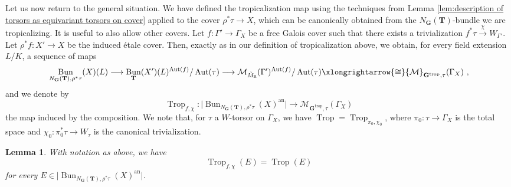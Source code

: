 \documentclass[10pt, a4paper]{amsart}
\newtheorem{lemma}[theorem]{Lemma}
\theoremstyle{definition}
\theoremstyle{myitemstyle}
\newcommand{\R}{\mathbb{R}}
\newcommand{\Mcheck}{{\check{M}}}
\newcommand{\bfG}{\mathbf{G}}
\newcommand{\bfT}{\mathbf{T}}
\newcommand{\mc}[1]{{\mathcal{#1}}}
\DeclareMathOperator{\Aut}{Aut}
\DeclareMathOperator{\Trop}{Trop}
\DeclareMathOperator{\Bun}{Bun}
\newcommand{\an}{\mathrm{an}}
\newcommand{\trop}{{\mathrm{trop}}}
\newcommand{\Ga}{\Gamma}
\begin{document}
Let us now return to the general situation. We have defined the tropicalization map using the techniques from Lemma \ref{lem:description of torsors as equivariant torsors on cover} applied to the cover $\rho^*\tau\to X$, which can be canonically obtained from the $N_\bfG(\bfT)$-bundle we are tropicalizing. It is useful to also allow other covers. 
Let $f\colon \Gamma'\to \Gamma_X$ be a free Galois  cover such that there exists a trivialization $f^*\tau\xrightarrow{\chi}W_{\Gamma'}$.
Let $\rho^*f\colon X'\to X$ be the induced étale cover.
Then, exactly as in our definition of tropicalization above, we obtain, for every field extension $L/K$, a sequence of maps
\[
\Bun_{N_\bfG(\bfT),\rho^*\tau}(X)(L) \longrightarrow \Bun_{\bfT}(X')(L)^{\Aut(f)}/\Aut(\tau) \longrightarrow \mc M_{\Mcheck_\R}(\Gamma')^{\Aut(f)}/\Aut(\tau)\xlongrightarrow{\cong} \mc M_{\bfG^\trop,\tau}(\Gamma_X) \ ,
\]
and we denote by
\[
\Trop_{f,\chi}\colon \big|\Bun_{N_\bfG(\bfT),\rho^*\tau}(X)^\an\big|\longrightarrow \mc M_{\bfG^\trop,\tau}(\Gamma_X)
\]
the map induced by the composition. We note that, for $\tau$ a $W$-torsor on $\Ga_X$, we have $\Trop=\Trop_{\pi_0,\chi_0}$, where $\pi_0:\tau\to \Ga_X$ is the total space and $\chi_0:\pi_0^*\tau\to W_{\tau}$ is the canonical trivialization. 

\begin{lemma}
\label{lem:tropicalization wrt a cover}
With notation as above, we have 
\[
    \Trop_{f,\chi}(E)=\Trop(E)
\]
for every $E\in \big|\Bun_{N_\bfG(\bfT),\rho^*\tau}(X)^\an\big|$.
\end{lemma}
\end{document}
